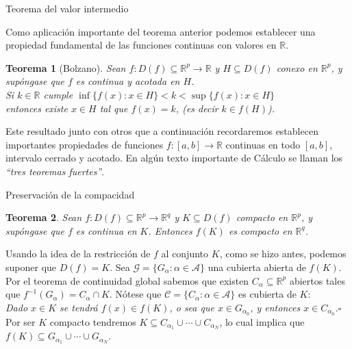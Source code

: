 \documentclass[xcolor=dvipsnames,10pt,handout, draft]{beamer}
\newcommand{\rz}{\mathbb R}
\newcommand{\rzp}{\mathbb R^{p}}
\newcommand{\rzq}{\mathbb R^{q}}
\newtheorem*{teo}{Teorema}
\begin{document}
\begin{frame}{Teorema del valor intermedio}

Como aplicaci\'on importante del teorema anterior podemos establecer una propiedad fundamental de las funciones continuas con valores en $\rz$.\pause

\begin{teo}[Bolzano]
Sean $f:D(f)\subseteq\rzp\to\rz$ y $H\subseteq D(f)$ conexo en $\rzp$, y sup\'ongase que $f$ es continua y acotada en $H$.\\ \pause
Si $k\in\rz$ cumple $\displaystyle\inf\big\{f(x):x\in H\big\}<k<\sup\big\{f(x):x\in H\big\}$\pause\\
entonces existe $x\in H$ tal que $f(x)=k$, \pause (es decir $k\in f(H)$).\pause
\end{teo}\pause

Este resultado junto con otros que a continuaci\'on recordaremos establecen importantes propiedades de funciones $f:[a,b]\to\mathbb R$ continuas en todo $[a,b]$, intervalo cerrado y acotado. \pause\vskip4pt En alg\'un texto importante de C\'alculo se llaman los {\em ``tres teoremas fuertes''}.

\end{frame}


\begin{frame}{Preservaci\'on de la compacidad}\pause

\begin{teo}
Sean $f:D(f)\subseteq\rzp\to\rzq$ y $K\subseteq D(f)$ compacto en $\rzp$, y sup\'ongase que $f$ es continua en $K$. Entonces $f(K)$ es compacto en $\rzq$. \pause
\end{teo}

Usando la idea de la restricci\'on de $f$ al conjunto $K$, como se hizo antes, podemos suponer que $D(f)=K$.
\vskip4pt\pause
Sea $\mathcal G=\big\{G_\alpha:\alpha\in\mathcal A\big\}$ una cubierta abierta de $f(K)$.
\vskip4pt\pause
Por el teorema de continuidad global sabemos que existen $C_\alpha\subseteq\rzp$ abiertos tales que $f^{-1}(G_\alpha)=C_\alpha\cap K$.
\vskip4pt\pause
N\'otese que $\mathcal C=\big\{C_\alpha:\alpha\in\mathcal A\big\}$ es cubierta de $K$:\pause\\
{\color{green!37!black}\em Dado $x\in K$ se tendr\'a $\displaystyle f(x)\in f(K)$, \pause o sea que $x\in G_{\alpha_0}$, y entonces $x\in C_{\alpha_0}$.}\hfill$\square$
\vskip4pt\pause
Por ser $K$ compacto tendremos $K\subseteq C_{\alpha_1}\cup\cdots\cup C_{\alpha_N}$, \pause lo cual implica que $\displaystyle f(K)\subseteq G_{\alpha_1}\cup\cdots\cup G_{\alpha_N}$.

\end{frame}
\end{document}
